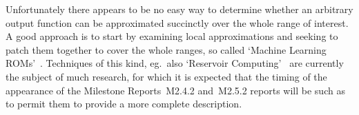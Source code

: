 Unfortunately there appears to be no easy way to determine whether an arbitrary
output function can be approximated succinctly over the whole range of interest.
A good approach is to start by examining local approximations and seeking to patch
them together to cover the whole ranges, so called `Machine Learning
ROMs'~\cite[\S\,12.7]{bruntonkutz}. Techniques
of this kind, eg.\ also `Reservoir Computing'~\cite{Pa18Hybr}  are currently
the subject of much research, for which it is expected that the
timing of the appearance of the Milestone Reports~M2.4.2 and~M2.5.2  reports
will be such as to permit them to provide a more complete description.

